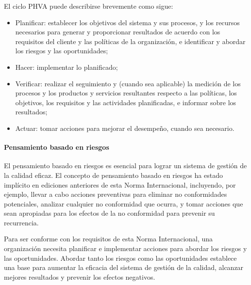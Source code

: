 				\par \noindent
					El ciclo PHVA puede describirse brevemente como sigue:
					\begin{itemize}
						\item Planificar: establecer los objetivos del sistema y sus procesos, y los recursos necesarios para
						generar y proporcionar resultados de acuerdo con los requisitos del cliente y las políticas de la
						organización, e identificar y abordar los riesgos y las oportunidades;
						
						\item Hacer: implementar lo planificado;
						
						\item Verificar: realizar el seguimiento y (cuando sea aplicable) la medición de los procesos y los productos
						y servicios resultantes respecto a las políticas, los objetivos, los requisitos y las actividades
						planificadas, e informar sobre los resultados;
						
						\item Actuar: tomar acciones para mejorar el desempeño, cuando sea necesario.
					\end{itemize}
				
				\newpage
				\thispagestyle{plain}
				
			\paragraph{Pensamiento basado en riesgos}\mbox{}
				
				El pensamiento basado en riesgos es esencial para lograr un sistema de gestión de la calidad eficaz. El concepto de pensamiento basado en riesgos ha estado implícito en ediciones anteriores de esta Norma Internacional, incluyendo, por ejemplo, llevar a cabo acciones preventivas para eliminar no conformidades potenciales, analizar cualquier no conformidad que ocurra, y tomar acciones que sean apropiadas para los efectos de la no conformidad para prevenir su recurrencia.
				
				\par \noindent
					Para ser conforme con los requisitos de esta Norma Internacional, una organización necesita planificar
					e implementar acciones para abordar los riesgos y las oportunidades. Abordar tanto los riesgos como
					las oportunidades establece una base para aumentar la eficacia del sistema de gestión de la calidad,
					alcanzar mejores resultados y prevenir los efectos negativos.
				
